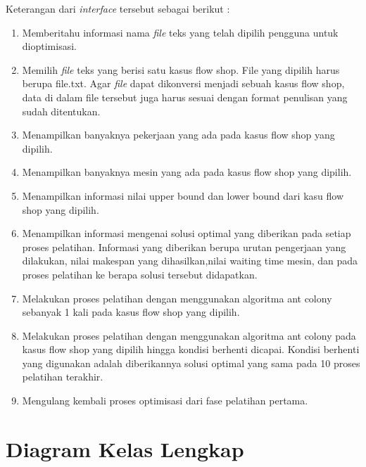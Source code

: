 	Keterangan dari {\it interface} tersebut sebagai berikut :
	\begin{enumerate}
		\item Memberitahu informasi nama {\it file} teks yang telah dipilih pengguna untuk dioptimisasi.
		\item Memilih {\it file} teks yang berisi satu kasus flow shop. File yang dipilih harus berupa file.txt. 
		Agar {\it file} dapat dikonversi menjadi sebuah kasus flow shop, data di dalam file tersebut juga harus sesuai 
		dengan format penulisan yang sudah ditentukan.
		\item Menampilkan banyaknya pekerjaan yang ada pada kasus flow shop yang dipilih.
		\item Menampilkan banyaknya mesin yang ada pada kasus flow shop yang dipilih.
		\item Menampilkan informasi nilai upper bound dan lower bound dari kasu flow shop yang dipilih.
		\item Menampilkan informasi mengenai solusi optimal yang diberikan pada setiap proses pelatihan.
		Informasi yang diberikan berupa urutan pengerjaan yang dilakukan, nilai makespan yang
		dihasilkan,nilai waiting time mesin, dan pada proses pelatihan ke berapa solusi tersebut didapatkan.
		\item Melakukan proses pelatihan dengan menggunakan algoritma ant colony sebanyak 1 kali pada
		kasus flow shop yang dipilih.
		\item Melakukan proses pelatihan dengan menggunakan algoritma ant colony pada kasus flow shop yang dipilih hingga 
		kondisi berhenti dicapai. Kondisi berhenti yang digunakan adalah diberikannya solusi optimal yang sama pada 10 proses pelatihan terakhir.
		\item Mengulang kembali proses optimisasi dari fase pelatihan pertama.
	\end{enumerate}

\section{Diagram Kelas Lengkap}
	
